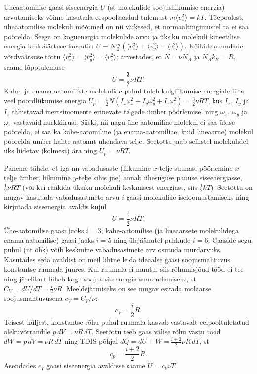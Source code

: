 \documentclass[a4paper,11pt,twocolumn]{article}
\begin{document}
Üheaatomilise gaasi siseenergia \( U \) (st molekulide soojusliikumise energia) arvutamiseks võime kasutada eespoolsaadud tulemust \( m\langle v^2_x\rangle = kT \). Tõepoolest, üheaatomilise molekuli mõõtmed on nii väikesed, et normaaltingimustel ta ei saa pöörelda. Seega on koguenergia molekulide arvu ja üksiku molekuli kineetilise energia keskväärtuse korrutis: \( U=N\frac{m}{2} (\langle v^2_x\rangle + \langle v^2_y\rangle + \langle v^2_z\rangle).\) Kõikide suundade võrdväärsuse tõttu \( \langle v^2_x\rangle = \langle v^2_y\rangle = \langle v^2_z\rangle \); arvestades, et \( N=\nu N_A \) ja \( N_A k_B=R \), saame lõpptulemuse
\[ U=\frac{3}{2} \nu RT.\]
Kahe- ja enama-aatomiliste molekulide puhul tuleb kulgliikumise energiale liita veel pöördliikumise energia \( U_p =\frac{1}{2} N(I_x\omega_x^2 + I_y\omega_y^2 + I_z\omega_z^2)=\frac{3}{2} \nu RT \), kus \( I_x \), \( I_y \) ja \( I_z \) tähistavad inertsimomente erinevate telgede ümber pöörlemisel ning \( \omega_x \), \( \omega_y \) ja \( \omega_z \) vastavaid nurkkiirusi. Siiski, nii nagu ühe-aatomiline molekul ei saa üldse pöörelda, ei saa ka kahe-aatomiline (ja enama-aatomiline, kuid lineaarne) molekul pöörelda ümber kahte aatomit ühendava telje. Seetõttu jääb sellistel molekulidel üks liidetav (kolmest) ära ning \( U_p=\nu RT .\)

Paneme tähele, et iga nn vabadusaste (liikumine \( x \)-telje suunas, pöörlemine \( x \)-telje ümber, liikumine \( y \)-telje sihis jne) annab ühesuguse panuse siseenergiasse, \( \frac{1}{2}\nu RT \) (või kui rääkida üksiku molekuli keskmisest energiast, siis \( \frac{1}{2}kT \)). Seetõttu on mugav kasutada vabadusastmete arvu \( i \) gaasi molekulide iseloomustamiseks ning kirjutada siseenergia avaldis kujul
\[ U=\frac{i}{2} \nu RT.\]
Ühe-aatomilise gaasi jaoks \( i = 3 \), kahe-aatomilise (ja lineaarsete molekulidega enama-aatomilise) gaasi jaoks \( i = 5 \) ning ülejäänutel puhkude \( i = 6 \). Gaaside segu puhul (nt õhk) võib keskmine vabadusastmete arv osutuda murdarvuks. Kasutades seda avaldist on meil lihtne leida ideaalse gaasi soojusmahtuvus konstantse ruumala juures. Kui ruumala ei muutu, siis rõhumisjõud tööd ei tee ning järelikult läheb kogu soojus siseenergia suurendamiseks, st \( C_V = dU/dT = \frac{i}{2} \nu R \). Meeldejätmiseks on see mugav esitada molaarse soojusmahtuvusena \( c_V = C_V /\nu \):
\[ c_V = \frac{i}{2} R. \]
Teisest küljest, konstantse rõhu puhul ruumala kasvab vastavalt eelpooltuletatud olekuvõrrandile \( p\, dV = νR\, dT \). Seetõttu teeb gaas välise rõhu vastu tööd \( dW = p\, dV = \nu R\, dT \) ning TDIS põhjal \( dQ = dU + W = \frac{i+2}{2} \nu R\, dT \), st
\[ c_p=\frac{i+2}{2}R.\]
Asendades \( c_V \) gaasi siseenergia avaldisse saame \( U=c_V \nu T \).
\end{document}
